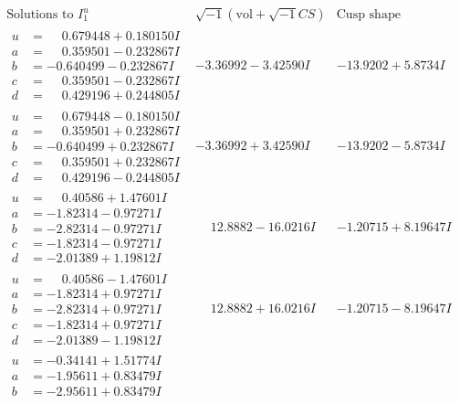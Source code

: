 \documentclass[1p]{elsarticle_modified}
\theoremstyle{definition}
\newcommand{\I}{\sqrt{-1}}
\begin{document}
$$\begin{array}{c|c|c}  
\text{Solutions to }I^u_{1}& \I (\text{vol} + \sqrt{-1}CS) & \text{Cusp shape}\\
 \hline 
\begin{aligned}
u &= \phantom{-}0.679448 + 0.180150 I \\
a &= \phantom{-}0.359501 - 0.232867 I \\
b &= -0.640499 - 0.232867 I \\
c &= \phantom{-}0.359501 - 0.232867 I \\
d &= \phantom{-}0.429196 + 0.244805 I\end{aligned}
 & -3.36992 - 3.42590 I & -13.9202 + 5.8734 I \\ \hline\begin{aligned}
u &= \phantom{-}0.679448 - 0.180150 I \\
a &= \phantom{-}0.359501 + 0.232867 I \\
b &= -0.640499 + 0.232867 I \\
c &= \phantom{-}0.359501 + 0.232867 I \\
d &= \phantom{-}0.429196 - 0.244805 I\end{aligned}
 & -3.36992 + 3.42590 I & -13.9202 - 5.8734 I \\ \hline\begin{aligned}
u &= \phantom{-}0.40586 + 1.47601 I \\
a &= -1.82314 - 0.97271 I \\
b &= -2.82314 - 0.97271 I \\
c &= -1.82314 - 0.97271 I \\
d &= -2.01389 + 1.19812 I\end{aligned}
 & \phantom{-}12.8882 - 16.0216 I & -1.20715 + 8.19647 I \\ \hline\begin{aligned}
u &= \phantom{-}0.40586 - 1.47601 I \\
a &= -1.82314 + 0.97271 I \\
b &= -2.82314 + 0.97271 I \\
c &= -1.82314 + 0.97271 I \\
d &= -2.01389 - 1.19812 I\end{aligned}
 & \phantom{-}12.8882 + 16.0216 I & -1.20715 - 8.19647 I \\ \hline\begin{aligned}
u &= -0.34141 + 1.51774 I \\
a &= -1.95611 + 0.83479 I \\
b &= -2.95611 + 0.83479 I \\

\end{aligned}
\end{array}$$
\end{document}
